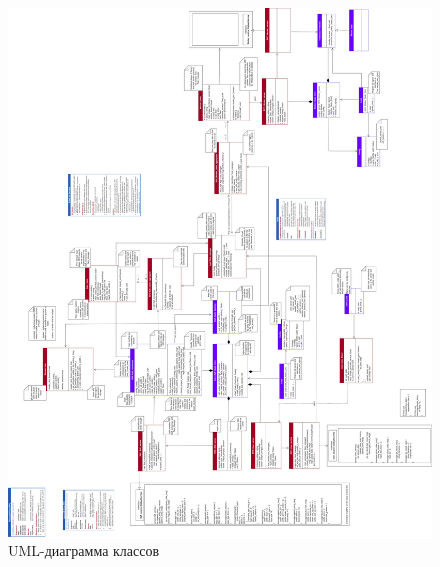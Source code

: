 
\begin{figure}
    \centering
    \includegraphics[scale=0.185]{inc/full-uml-diagram.png}
    \caption{UML-диаграмма классов}
    \label{fig:a1}
\end{figure}
